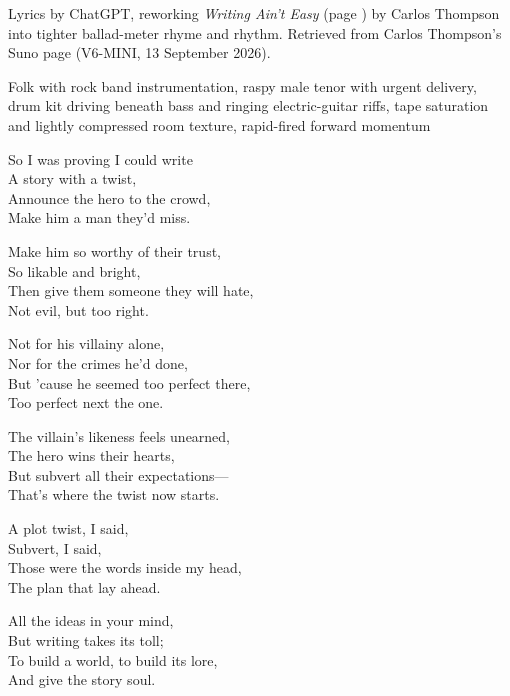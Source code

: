 
\begin{notes}
Lyrics by ChatGPT, reworking \emph{Writing Ain't Easy} (page \pageref{sec:writing-aint-easy}) by Carlos Thompson into tighter ballad-meter rhyme and rhythm. Retrieved from Carlos Thompson's Suno page (V6-MINI, 13 September 2026).
\end{notes}
\begin{style}
Folk with rock band instrumentation, raspy male tenor with urgent delivery, drum kit driving beneath bass and ringing electric-guitar riffs, tape saturation and lightly compressed room texture, rapid-fired forward momentum
\end{style}
\begin{lyrics}
So I was proving I could write\\
A story with a twist,\\
Announce the hero to the crowd,\\
Make him a man they'd miss.

Make him so worthy of their trust,\\
So likable and bright,\\
Then give them someone they will hate,\\
Not evil, but too right.

Not for his villainy alone,\\
Nor for the crimes he'd done,\\
But 'cause he seemed too perfect there,\\
Too perfect next the one.

The villain's likeness feels unearned,\\
The hero wins their hearts,\\
But subvert all their expectations—\\
That's where the twist now starts.

A plot twist, I said,\\
Subvert, I said,\\
Those were the words inside my head,\\
The plan that lay ahead.

All the ideas in your mind,\\
But writing takes its toll;\\
To build a world, to build its lore,\\
And give the story soul.


\end{lyrics}
